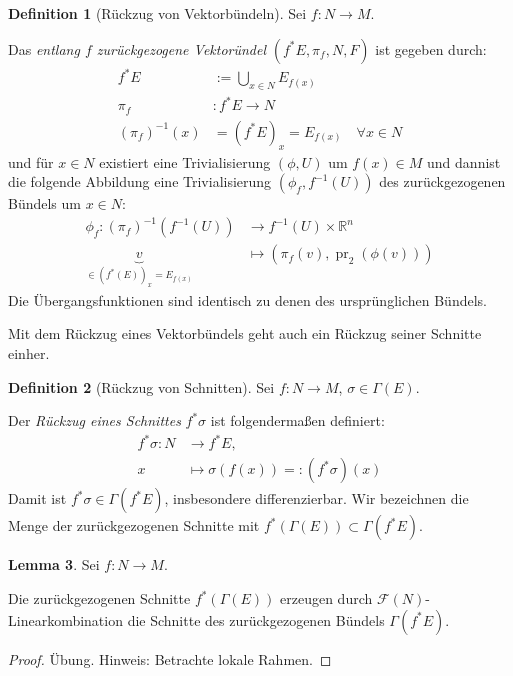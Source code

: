 \documentclass[a4paper]{scrreprt}
\numberwithin{equation}{chapter}
\DeclareMathOperator{\pr}{pr}
\newcommand{\R}{\mathbb{R}}
\newcommand{\sm}{\mathcal{F}}
\theoremstyle{definition}
\newtheorem{defn}{Definition}[section]
\newtheorem{lemma}[defn]{Lemma}
\begin{document}
		\begin{defn}[Rückzug von Vektorbündeln]
			Sei $f\colon N\rightarrow M$.
			
			Das \emph{entlang $f$ zurückgezogene Vektoründel} $(f^*E,\pi_f,N, F)$ ist gegeben durch:
			\begin{align*}
				f^*E&:=\bigcup _{x\in N} E_{f(x)}\\
				\pi_f&\colon f^*E\rightarrow N\\
				(\pi_f)^{-1}(x)&=(f^*E)_x=E_{f(x)}\quad\forall x\in N
			\end{align*}
			und für $x\in N$ existiert eine Trivialisierung $(\phi,U)$ um $f(x)\in M$ und dannist die folgende Abbildung eine Trivialisierung $(\phi_f,f^{-1}(U))$ des zurückgezogenen Bündels um $x\in N$:
			\begin{align*}
				\phi_f \colon (\pi_f)^{-1}(f^{-1}(U))&\rightarrow f^{-1}(U)\times\R^n\\
				\underbrace{v}_{\in (f^*(E))_x=E_{f(x)}}&\mapsto (\pi_f(v),\pr_2(\phi(v)))
			\end{align*}
			Die Übergangsfunktionen sind identisch zu denen des ursprünglichen Bündels.
		\end{defn}
		Mit dem Rückzug eines Vektorbündels geht auch ein Rückzug seiner Schnitte einher.
		\begin{defn}[Rückzug von Schnitten]
			Sei $f:N\rightarrow M$, $\sigma\in\Gamma(E)$.
			
			Der \emph{Rückzug eines Schnittes} $f^*\sigma$ ist folgendermaßen definiert:
			\begin{align*}
				f^*\sigma\colon N &\rightarrow f^*E,\\
				x &\mapsto \sigma(f(x))=: (f^*\sigma)(x)
			\end{align*}
			Damit ist $f^*\sigma\in\Gamma(f^*E)$, insbesondere differenzierbar. Wir bezeichnen die Menge der zurückgezogenen Schnitte mit $f^*(\Gamma(E))\subset\Gamma(f^*E)$.
		\end{defn}
		\begin{lemma}\label{lemma:Zurückziehen_von_Schnitten}
			Sei $f:N\rightarrow M$.
			
			Die zurückgezogenen Schnitte $f^*(\Gamma(E))$ erzeugen durch $\sm(N)$-Linearkombination die Schnitte des zurückgezogenen Bündels $\Gamma(f^*E)$.
			\begin{proof}
				Übung. Hinweis: Betrachte lokale Rahmen.
			\end{proof}
		\end{lemma}
\end{document}
